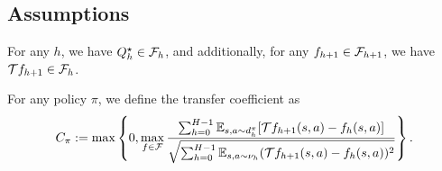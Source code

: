 \vspace{-0.2cm}
\subsection{Assumptions}
\label{subsec:HyQ-assumptions}
\vspace{-0.2cm}

\begin{assumption}
\label{assump:realizability-completeness}
For any $h$, we have $Q^\star_h\in \mathcal F_h$, and additionally, for any $f_{h+1}\in \mathcal F_{h+1}$, we have $\mathcal T f_{h+1}\in \mathcal F_h$.
\end{assumption}



\begin{definition}
\label{def:bellman-error-coeff-hy-q}
For any policy $\pi$, we define the transfer coefficient as 
\begin{equation}
    C_\pi:=\max\left\{ 0,\max_{f\in \mathcal F}\frac{\sum_{h=0}^{H-1}\mathbb E_{s,a\sim d_h^\pi}[\mathcal T f_{h+1}(s,a)-f_h(s,a)]}{\sqrt{\sum_{h=0}^{H-1}\mathbb E_{s,a\sim \nu_h}(\mathcal T f_{h+1}(s,a)-f_h(s,a))^2}} \right\}.
\end{equation}
\end{definition}

